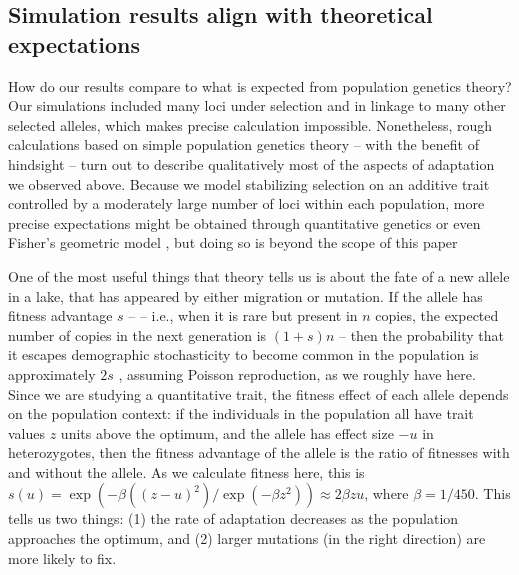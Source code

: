 \documentclass{article}
\begin{document}
\subsection*{Simulation results align with theoretical expectations}

How do our results compare to what is expected from population genetics theory?
Our simulations included many loci under selection and in linkage to many other selected alleles,
which makes precise calculation impossible.
Nonetheless, rough calculations based on simple population genetics theory
-- with the benefit of hindsight --
turn out to describe qualitatively most of the aspects of adaptation we observed above.
Because we model stabilizing selection on an additive trait controlled by a moderately large number of loci within each population, more precise expectations might be obtained through quantitative genetics \citep{svardal2014general} or even Fisher's geometric model \citep{barton2001hybridization,chevin2014niche},
but doing so is beyond the scope of this paper

One of the most useful things that theory tells us is about
the fate of a new allele in a lake, that has appeared by either migration or mutation. 
If the allele has fitness advantage $s$ --
-- i.e., when it is rare but present in $n$ copies,
the expected number of copies in the next generation is $(1+s)n$ --
then the probability that it escapes demographic stochasticity to become common in the population 
is approximately $2s$ \citep{lambert2006probability,haldane1927mathematical} 
, assuming Poisson reproduction, as we roughly have here. 
Since we are studying a quantitative trait, the fitness effect of each allele
depends on the population context:
if the individuals in the population all have trait values $z$ units above the optimum,
and the allele has effect size $-u$ in heterozygotes,
then the fitness advantage of the allele is the ratio of fitnesses with and without the allele.
As we calculate fitness here, this is
$s(u) = \exp(-\beta((z - u)^2) / \exp( - \beta z^2)) \approx 2 \beta z u$,
where $\beta = 1 / 450$. 
This tells us two things: (1) the rate of adaptation decreases as the population approaches the optimum, and (2) larger mutations (in the right direction) are more likely to fix.
\end{document}

